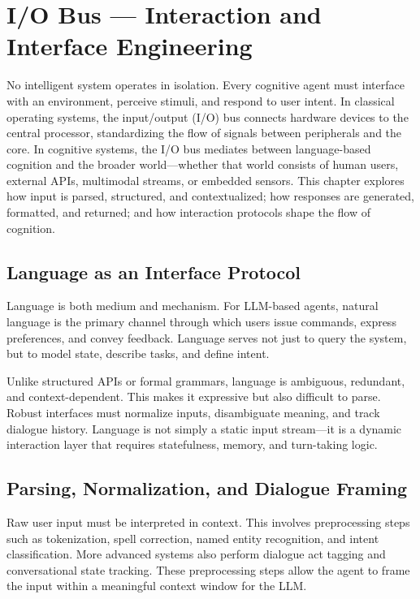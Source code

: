 \documentclass{book}
\begin{document}
\chapter{I/O Bus — Interaction and Interface Engineering}

No intelligent system operates in isolation. Every cognitive agent must interface with an environment, perceive stimuli, and respond to user intent. In classical operating systems, the input/output (I/O) bus connects hardware devices to the central processor, standardizing the flow of signals between peripherals and the core. In cognitive systems, the I/O bus mediates between language-based cognition and the broader world—whether that world consists of human users, external APIs, multimodal streams, or embedded sensors. This chapter explores how input is parsed, structured, and contextualized; how responses are generated, formatted, and returned; and how interaction protocols shape the flow of cognition.

\section{Language as an Interface Protocol}

Language is both medium and mechanism. For LLM-based agents, natural language is the primary channel through which users issue commands, express preferences, and convey feedback. Language serves not just to query the system, but to model state, describe tasks, and define intent.

Unlike structured APIs or formal grammars, language is ambiguous, redundant, and context-dependent. This makes it expressive but also difficult to parse. Robust interfaces must normalize inputs, disambiguate meaning, and track dialogue history. Language is not simply a static input stream—it is a dynamic interaction layer that requires statefulness, memory, and turn-taking logic.

\section{Parsing, Normalization, and Dialogue Framing}

Raw user input must be interpreted in context. This involves preprocessing steps such as tokenization, spell correction, named entity recognition, and intent classification. More advanced systems also perform dialogue act tagging and conversational state tracking. These preprocessing steps allow the agent to frame the input within a meaningful context window for the LLM.
\end{document}
